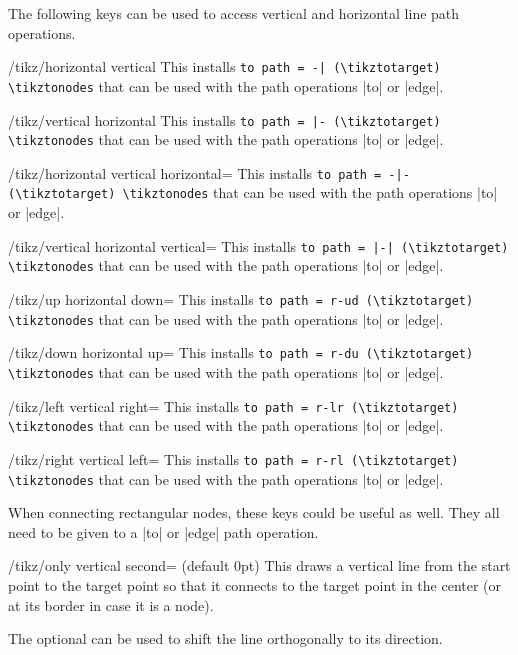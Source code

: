 The following keys can be used to access vertical and horizontal line path operations.
\begin{stylekey}{/tikz/horizontal vertical}
  This installs  \verb!to path = -| (\tikztotarget) \tikztonodes!
  that can be used with the path operations |to| or |edge|.
\end{stylekey}
\begin{stylekey}{/tikz/vertical horizontal}
  This installs \verb!to path = |- (\tikztotarget) \tikztonodes!
  that can be used with the path operations |to| or |edge|.
\end{stylekey}
\begin{stylekey}{/tikz/horizontal vertical horizontal=}
  This installs  \verb!to path = -|- (\tikztotarget) \tikztonodes!
  that can be used with the path operations |to| or |edge|.
\end{stylekey}
\begin{stylekey}{/tikz/vertical horizontal vertical=}
  This installs  \verb!to path = |-| (\tikztotarget) \tikztonodes!
  that can be used with the path operations |to| or |edge|.
\end{stylekey}
\begin{stylekey}{/tikz/up horizontal down=}
  This installs  \verb!to path = r-ud (\tikztotarget) \tikztonodes!
  that can be used with the path operations |to| or |edge|.
\end{stylekey}
\begin{stylekey}{/tikz/down horizontal up=}
  This installs  \verb!to path = r-du (\tikztotarget) \tikztonodes!
  that can be used with the path operations |to| or |edge|.
\end{stylekey}
\begin{stylekey}{/tikz/left vertical right=}
  This installs  \verb!to path = r-lr (\tikztotarget) \tikztonodes!
  that can be used with the path operations |to| or |edge|.
\end{stylekey}
\begin{stylekey}{/tikz/right vertical left=}
  This installs  \verb!to path = r-rl (\tikztotarget) \tikztonodes!
  that can be used with the path operations |to| or |edge|.
\end{stylekey}
When connecting rectangular nodes, these keys could be useful as well.
They all need to be given to a |to| or |edge| path operation.
\begin{stylekey}{/tikz/only vertical second= (default 0pt)}
This draws a vertical line from the start point to the target point so that
it connects to the target point in the center (or at its border in case it is a node).

The optional  can be used to shift the line orthogonally to its direction.
\end{stylekey}
